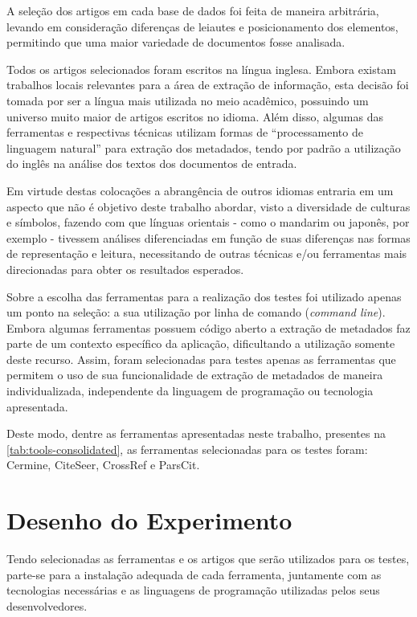 A seleção dos artigos em cada base de dados foi feita de maneira arbitrária, levando em consideração diferenças de leiautes e posicionamento dos elementos, permitindo que uma maior variedade de documentos fosse analisada.


Todos os artigos selecionados foram escritos na língua inglesa. Embora existam trabalhos locais relevantes para a área de extração de informação, esta decisão foi tomada por ser a língua mais utilizada no meio acadêmico, possuindo um universo muito maior de artigos escritos no idioma. Além disso, algumas das ferramentas e respectivas técnicas utilizam formas de ``processamento de linguagem natural'' para extração dos metadados, tendo por padrão a utilização do inglês na análise dos textos dos documentos de entrada.

Em virtude destas colocações a abrangência de outros idiomas entraria em um aspecto que não é objetivo deste trabalho abordar, visto a diversidade de culturas e símbolos, fazendo com que línguas orientais - como o mandarim ou japonês, por exemplo - tivessem análises diferenciadas em função de suas diferenças nas formas de representação e leitura, necessitando de outras técnicas e/ou ferramentas mais direcionadas para obter os resultados esperados.

Sobre a escolha das ferramentas para a realização dos testes foi utilizado apenas um ponto na seleção: a sua utilização por linha de comando (\emph{command line}). Embora algumas ferramentas possuem código aberto a extração de metadados faz parte de um contexto específico da aplicação, dificultando a utilização somente deste recurso. Assim, foram selecionadas para testes apenas as ferramentas que permitem o uso de sua funcionalidade de extração de metadados de maneira individualizada, independente da linguagem de programação ou tecnologia apresentada. 

Deste modo, dentre as ferramentas apresentadas neste trabalho, presentes na \autoref{tab:tools-consolidated}, as ferramentas selecionadas para os testes foram: Cermine, CiteSeer, CrossRef e ParsCit.
    
\section{Desenho do Experimento}
\label{sec:experiment-design}

Tendo selecionadas as ferramentas e os artigos que serão utilizados para os testes, parte-se para a instalação adequada de cada ferramenta, juntamente com as tecnologias necessárias e as linguagens de programação utilizadas pelos seus desenvolvedores. 


